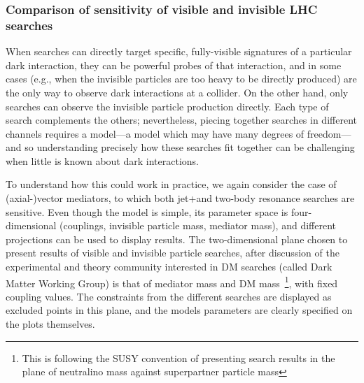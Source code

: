

\subsubsection{Comparison of sensitivity of visible and invisible LHC searches}
\label{sub:comparisonVisibleInvisible}

When searches can directly target specific, fully-visible signatures of a particular dark interaction, they can be powerful probes of that interaction, and in some cases (e.g., when the invisible particles are too heavy to be directly produced) are the only way to observe dark interactions at a collider. On the other hand, only \MET searches can observe the invisible particle production directly. Each type of search complements the others; nevertheless, piecing together searches in different channels requires a model---a model which may have many degrees of freedom---and so understanding precisely how these searches fit together can be challenging when little is known about dark interactions.

To understand how this could work in practice, we again consider the case of (axial-)vector mediators, to which both jet+\MET and two-body resonance searches are sensitive. Even though the model is simple, its parameter space is four-dimensional (couplings, invisible particle mass, mediator mass), and different projections can be used to display results. The two-dimensional plane chosen to present results of visible and invisible particle searches, after discussion of the experimental and theory community interested in DM searches (called Dark Matter Working Group) is that of mediator mass and DM mass~\footnote{This is following the SUSY convention of presenting search results in the plane of neutralino mass against superpartner particle mass}, with fixed coupling values. The constraints from the different searches are displayed as excluded points in this plane, and the models parameters are clearly specified on the plots themselves.  

